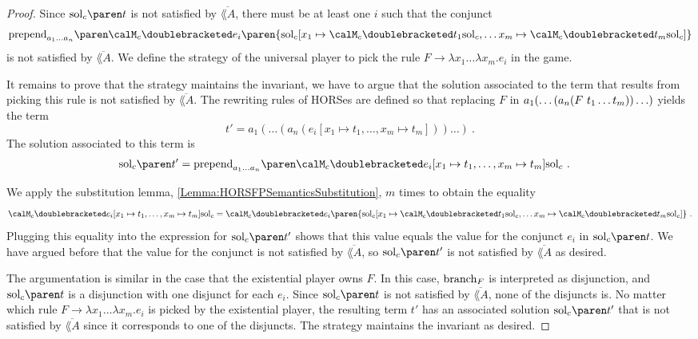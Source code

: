 \documentclass[../../diss.tex]{subfiles}
\begin{document}
\begin{proof}
    Since $\solc{t}$ is not satisfied by $\overline{\lang{A}}$, there must be at least one $i$ such that the conjunct
    \[
        \prepend{a_1 \ldots a_n}%
        {%
        \semc{e_i}{ \paren{\solc [x_1 \mapsto \semc{t_1}{\solc}, \ldots x_m \mapsto \semc{t_m}{\solc}]} }
        }
    \]
    is not satisfied by $\overline{\lang{A}}$.
    We define the strategy of the universal player to pick the rule
    $F \to \lambda x_1 \ldots \lambda x_m . e_i$ in the game.

    It remains to prove that the strategy maintains the invariant, \ie we have to argue that the solution associated to the term that results from picking this rule is not satisfied by $\overline{\lang{A}}$.
    The rewriting rules of HORSes are defined so that replacing $F$ in $a_1(\ldots(a_n(F \  t_1 \ldots t_m)) \ldots)$ yields the term
    \[
        t' = a_1(\ldots(a_n(e_i [x_1 \mapsto t_1,  \ldots, x_m \mapsto t_m])) \ldots)
        \ .
    \]
    The solution associated to this term is
    \begin{align*}
        \solc{t'}
        &=
        \prepend{a_1 \ldots a_n}%
        {%
        \semc{e_i [x_1 \mapsto t_1,  \ldots, x_m \mapsto t_m ] }{ \solc }
        }
        \ .
    \end{align*}

    We apply the substitution lemma, \cref{Lemma:HORSFPSemanticsSubstitution}, $m$ times to obtain the equality
    \[
        \semc{e_i [x_1 \mapsto t_1,  \ldots, x_m \mapsto t_m ] }{ \solc }
        =
        \semc{e_i}{ \paren{\solc [x_1 \mapsto \semc{t_1}{\solc}, \ldots x_m \mapsto \semc{t_m}{\solc}]} }
        \ .
    \]
    Plugging this equality into the expression for $\solc{t'}$ shows that this value equals the value for the conjunct $e_i$ in $\solc{t}$.
    We have argued before that the value for the conjunct is not satisfied by $\overline{\lang{A}}$, so $\solc{t'}$ is not satisfied by $\overline{\lang{A}}$ as desired.

    The argumentation is similar in the case that the existential player owns $F$.
    In this case, $\text{branch}_{F}$ is interpreted as disjunction, and $\solc{t}$ is a disjunction with one disjunct for each $e_i$.
    Since $\solc{t}$ is not satisfied by $\overline{\lang{A}}$, none of the disjuncts is.
    No matter which rule $F \to \lambda x_1 \ldots \lambda x_m . e_i$ is picked by the existential player, the resulting term $t'$ has an associated solution $\solc{t'}$ that is not satisfied by $\overline{\lang{A}}$ since it corresponds to one of the disjuncts.
    The strategy maintains the invariant as desired.
\end{proof}
\end{document}
